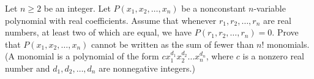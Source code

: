 Let $n\geq2$ be an integer. Let $P(x_1,x_2,\dots,x_n)$ be a nonconstant $n$-variable polynomial with real coefficients. Assume that whenever $r_1,r_2,\dots,r_n$ are real numbers, at least two of which are equal, we have $P(r_1,r_2,\dots,r_n)=0$. Prove that $P(x_1,x_2,\dots,x_n)$ cannot be written as the sum of fewer than $n!$ monomials. (A monomial is a polynomial of the form $cx_1^{d_1}x_2^{d_2}\dots x_n^{d_n}$, where $c$ is a nonzero real number and $d_1,d_2,\dots,d_n$ are nonnegative integers.)